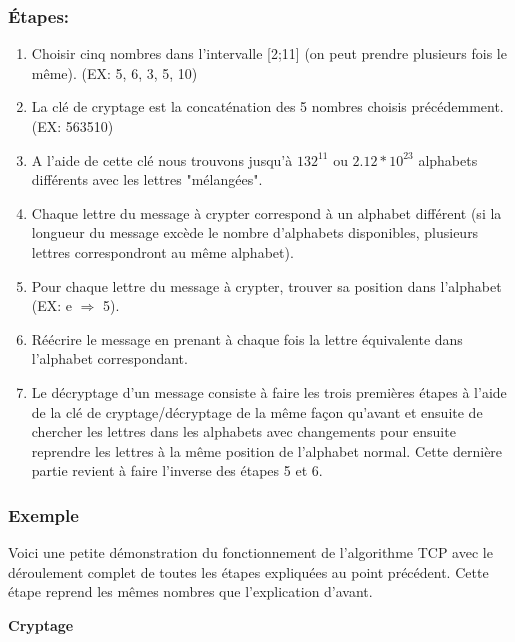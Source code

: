 \documentclass[a4paper,12pt]{report}
\begin{document}
  
   \subsubsection{Étapes:}
   \begin{enumerate}
  \item Choisir cinq nombres dans l'intervalle [2;11] (on peut prendre plusieurs fois le même). (EX: 5, 6, 3, 5, 10)
  \item La clé de cryptage est la concaténation des 5 nombres choisis précédem\-ment. (EX: 563510)
  \item A l'aide de cette clé nous trouvons jusqu'à $132^{11}$ ou $2.12*10^{23}$ alphabets différents avec les lettres "mélangées".
  \item Chaque lettre du message à crypter correspond à un alphabet différent (si la longueur du message excède le nombre d'alphabets disponibles, plusieurs lettres correspondront au même alphabet).
  \item Pour chaque lettre du message à crypter, trouver sa position dans l'alphabet (EX: e $\Rightarrow$ 5).
  \item Réécrire le message en prenant à chaque fois la lettre équivalente dans l'alphabet correspondant.
  \item Le décryptage d'un message consiste à faire les trois premières étapes à l'aide de la clé de cryptage/décryptage de la même façon qu'avant et ensuite de chercher les lettres dans les alphabets avec changements pour ensuite reprendre les lettres à la même position de l'alphabet normal. Cette dernière partie revient à faire l'inverse des étapes 5 et 6.
\end{enumerate}

\subsubsection{Exemple}

Voici une petite démonstration du fonctionnement de l'algorithme TCP avec le déroulement complet de toutes les étapes expliquées au point précédent. Cette étape reprend les mêmes nombres que l'explication d'avant. \newline

\textbf{Cryptage}
\end{document}
